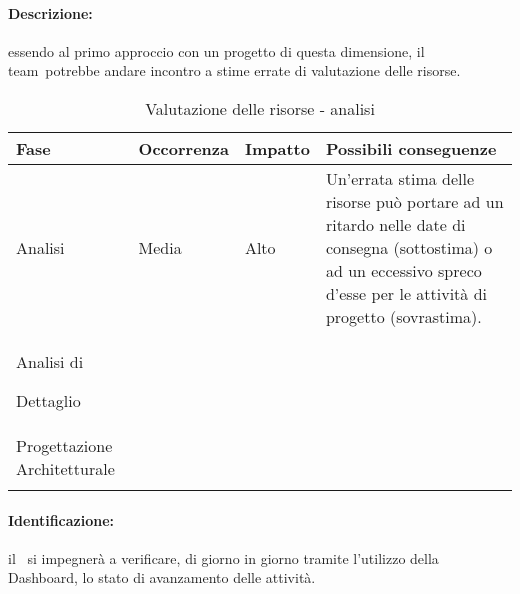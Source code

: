 \documentclass[../PianoProgetto.tex]{subfiles}
\begin{document}
	\paragraph*{Descrizione:} essendo al primo approccio con un progetto di questa dimensione, il team\g\ potrebbe andare incontro a stime errate di valutazione delle risorse.
	
	
	\begin{table}[h]
		\centering
		\begin{tabularx}{\textwidth}{F O O P}
			\toprule
			\textbf{Fase} & \textbf{Occorrenza} & \textbf{Impatto} & \textbf{Possibili conseguenze}\\
			\midrule
			Analisi & Media & Alto & Un'errata stima delle risorse può portare ad un ritardo nelle date di consegna (sottostima) o ad un eccessivo spreco d'esse per le attività di progetto (sovrastima). \\
			\midrule
			Analisi di \par Dettaglio & & & \\
			\midrule
			Progettazione Architetturale & & & \\
			\bottomrule
		\end{tabularx}
		\caption{Valutazione delle risorse - analisi}
		\label{tab:Valutazione delle risorse - analisi}	
	\end{table}
	
	\paragraph*{Identificazione:} il \responsabilediprogetto\ si impegnerà a verificare, di giorno in giorno tramite l'utilizzo della Dashboard\g, lo stato di avanzamento delle attività.
	
\end{document}
